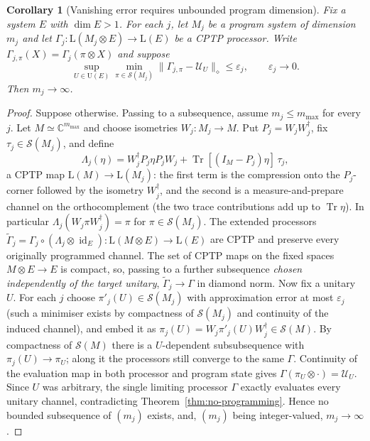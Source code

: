 \documentclass[11pt,a4paper]{article}
\newtheorem{corollary}[theorem]{Corollary}
\newcommand{\Lin}{\mathrm{L}}
\newcommand{\Sstate}{\mathcal{S}}
\newcommand{\Tr}{\operatorname{Tr}}
\newcommand{\id}{\operatorname{id}}
\begin{document}
\begin{corollary}[Vanishing error requires unbounded program dimension]
\label{cor:divergence}
Fix a system $E$ with $\dim E>1$. For each $j$, let $M_j$ be a program system of dimension $m_j$ and let $\Gamma_j:\Lin(M_j\otimes E)\to\Lin(E)$ be a CPTP processor. Write $\Gamma_{j,\pi}(X)=\Gamma_j(\pi\otimes X)$ and suppose
\[
\sup_{U\in\mathrm U(E)}\min_{\pi\in\Sstate(M_j)}
\|\Gamma_{j,\pi}-\mathcal U_U\|_\diamond
\le\varepsilon_j,\qquad\varepsilon_j\longrightarrow0.
\]
Then $m_j\to\infty$.
\end{corollary}

\begin{proof}
Suppose otherwise. Passing to a subsequence, assume $m_j\le m_{\max}$ for every $j$. Let $M\simeq\mathbb C^{m_{\max}}$ and choose isometries $W_j:M_j\to M$. Put $P_j=W_jW_j^\dagger$, fix $\tau_j\in\Sstate(M_j)$, and define
\[
\Lambda_j(\eta)=W_j^\dagger P_j\eta P_jW_j+\Tr[(I_M-P_j)\eta]\,\tau_j,
\]
a CPTP map $\Lin(M)\to\Lin(M_j)$: the first term is the compression onto the $P_j$-corner followed by the isometry $W_j^\dagger$, and the second is a measure-and-prepare channel on the orthocomplement (the two trace contributions add up to $\Tr\eta$). In particular $\Lambda_j(W_j\pi W_j^\dagger)=\pi$ for $\pi\in\Sstate(M_j)$. The extended processors $\widetilde\Gamma_j=\Gamma_j\circ(\Lambda_j\otimes\id_E):\Lin(M\otimes E)\to\Lin(E)$ are CPTP and preserve every originally programmed channel. The set of CPTP maps on the fixed spaces $M\otimes E\to E$ is compact, so, passing to a further subsequence \emph{chosen independently of the target unitary}, $\widetilde\Gamma_j\to\Gamma$ in diamond norm. Now fix a unitary $U$. For each $j$ choose $\pi'_j(U)\in\Sstate(M_j)$ with approximation error at most $\varepsilon_j$ (such a minimiser exists by compactness of $\Sstate(M_j)$ and continuity of the induced channel), and embed it as $\pi_j(U)=W_j\pi'_j(U)W_j^\dagger\in\Sstate(M)$. By compactness of $\Sstate(M)$ there is a $U$-dependent subsubsequence with $\pi_j(U)\to\pi_U$; along it the processors still converge to the same $\Gamma$. Continuity of the evaluation map in both processor and program state gives $\Gamma(\pi_U\otimes\cdot)=\mathcal U_U$. Since $U$ was arbitrary, the single limiting processor $\Gamma$ exactly evaluates every unitary channel, contradicting Theorem~\ref{thm:no-programming}. Hence no bounded subsequence of $(m_j)$ exists, and, $(m_j)$ being integer-valued, $m_j\to\infty$.
\end{proof}
\end{document}
